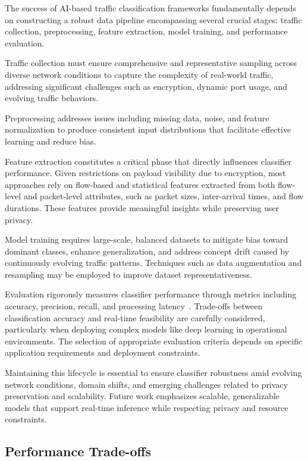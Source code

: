 \documentclass[sigconf]{acmart}
\begin{document}
The success of AI-based traffic classification frameworks fundamentally depends on constructing a robust data pipeline encompassing several crucial stages: traffic collection, preprocessing, feature extraction, model training, and performance evaluation.

Traffic collection must ensure comprehensive and representative sampling across diverse network conditions to capture the complexity of real-world traffic, addressing significant challenges such as encryption, dynamic port usage, and evolving traffic behaviors.

Preprocessing addresses issues including missing data, noise, and feature normalization to produce consistent input distributions that facilitate effective learning and reduce bias.

Feature extraction constitutes a critical phase that directly influences classifier performance. Given restrictions on payload visibility due to encryption, most approaches rely on flow-based and statistical features extracted from both flow-level and packet-level attributes, such as packet sizes, inter-arrival times, and flow durations. These features provide meaningful insights while preserving user privacy.

Model training requires large-scale, balanced datasets to mitigate bias toward dominant classes, enhance generalization, and address concept drift caused by continuously evolving traffic patterns. Techniques such as data augmentation and resampling may be employed to improve dataset representativeness.

Evaluation rigorously measures classifier performance through metrics including accuracy, precision, recall, and processing latency~\cite{ref51}. Trade-offs between classification accuracy and real-time feasibility are carefully considered, particularly when deploying complex models like deep learning in operational environments. The selection of appropriate evaluation criteria depends on specific application requirements and deployment constraints.

Maintaining this lifecycle is essential to ensure classifier robustness amid evolving network conditions, domain shifts, and emerging challenges related to privacy preservation and scalability. Future work emphasizes scalable, generalizable models that support real-time inference while respecting privacy and resource constraints.

\subsection{Performance Trade-offs}
\end{document}

